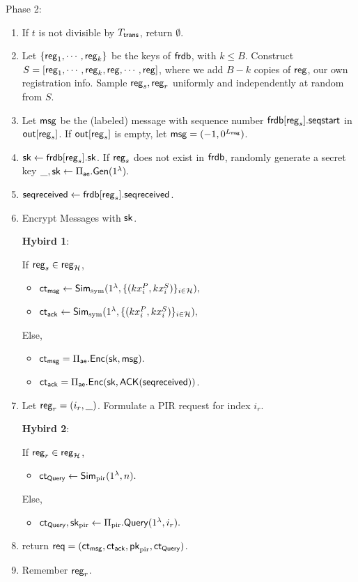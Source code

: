 Phase 2:
\begin{enumerate}
    \item If $t$ is not divisible by $T_{\mathsf{trans}}$, return $\emptyset$.
    \item Let $\{\mathsf{reg}_1, \cdots, \mathsf{reg}_k\}$ be the keys of $\mathsf{frdb}$, with $k\leq B$. Construct $S = [\mathsf{reg}_1,\cdots, \mathsf{reg}_k, \mathsf{reg}, \cdots, \mathsf{reg}]$, where we add $B - k$ copies of $\mathsf{reg}$, our own registration info. Sample $\mathsf{reg}_s, \mathsf{reg}_r$ uniformly and independently at random from $S$. 
    \item Let $\mathsf{msg}$ be the (labeled) message with sequence number $\mathsf{frdb}[\mathsf{reg}_s].\mathsf{seqstart}$ in $\mathsf{out}[\mathsf{reg}_s]$. If $\mathsf{out}[\mathsf{reg}_s]$ is empty, let $\mathsf{msg} = (-1, 0^{L_{\mathsf{msg}}})$.
    \item ${\mathsf{sk}} \leftarrow \mathsf{frdb}[\mathsf{reg}_s].{\mathsf{sk}}$. If $\mathsf{reg}_s$ does not exist in $\mathsf{frdb}$, randomly generate a secret key $\_, {\mathsf{sk}} \leftarrow \Pi_{\mathsf{ae}}.\mathsf{Gen}(1^{\lambda}).$
    \item $\mathsf{seqreceived} \leftarrow \mathsf{frdb}[\mathsf{reg}_s].\mathsf{seqreceived}$.
    \item Encrypt Messages with ${\mathsf{sk}}$.
    
    {\color{red} 
    \textbf{Hybird 1}:
    
    If $\mathsf{reg}_s \in \mathsf{reg}_{\mathcal{H}}$, 
    \begin{itemize}
        \item $\mathsf{ct}_{\mathsf{msg}} \leftarrow \mathsf{Sim}_{\text{sym}}(1^{\lambda},\{(kx_i^P, kx_i^S)\}_{i \in \mathcal{H}}),$
        \item $\mathsf{ct}_{\mathsf{ack}} \leftarrow \mathsf{Sim}_{\text{sym}}(1^{\lambda},\{(kx_i^P, kx_i^S)\}_{i \in \mathcal{H}}),$
    \end{itemize}
    Else, 
    }
    
    
    \begin{itemize}
        \item $\mathsf{ct}_{\mathsf{msg}} = \Pi_{\mathsf{ae}}.\mathsf{Enc}({\mathsf{sk}}, \mathsf{msg}).$
        \item $\mathsf{ct}_{\mathsf{ack}} = \Pi_{\mathsf{ae}}.\mathsf{Enc}({\mathsf{sk}}, \mathsf{ACK}(\mathsf{seqreceived}))$.
    \end{itemize}
    \item Let $\mathsf{reg}_r = (i_r, \_)$. Formulate a PIR request for index $i_r$. 
    
     {
     \color{red}
          
     \textbf{Hybird 2}:
         
     If $\mathsf{reg}_r \in \mathsf{reg}_{\mathcal{H}}$, 
    \begin{itemize}
        \item $\mathsf{ct}_{\mathsf{Query}} \leftarrow \mathsf{Sim}_{\text{pir}}(1^{\lambda}, n).$
    \end{itemize}
    Else, 
    }
    \begin{itemize}
        \item $\mathsf{ct}_{\mathsf{Query}}, {\mathsf{sk}}_{\text{pir}} \leftarrow \Pi_{\text{pir}}.\mathsf{Query}(1^{\lambda}, i_r).$
    \end{itemize}
    \item return $\mathsf{req} = (\mathsf{ct}_{\mathsf{msg}}, \mathsf{ct}_{\mathsf{ack}}, \mathsf{pk}_{\text{pir}}, \mathsf{ct}_{\mathsf{Query}})$.
    \item Remember $\mathsf{reg}_r$.
\end{enumerate}
